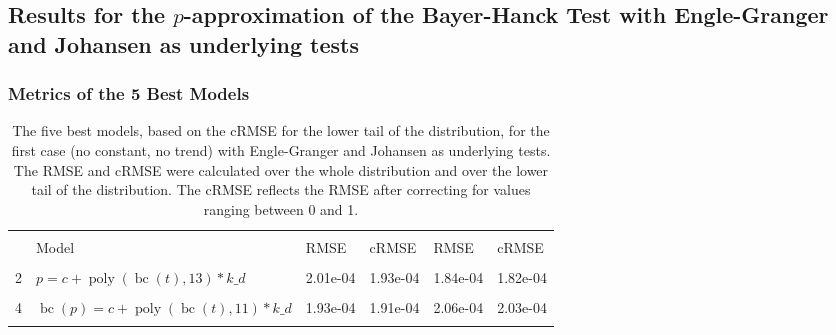 \documentclass[12pt,a4paper]{article}
\DeclareMathOperator{\bc}{bc}
\DeclareMathOperator{\poly}{poly}
\begin{document}
\hypertarget{results-for-the-p-approximation-of-the-bayer-hanck-test-with-engle-granger-and-johansen-as-underlying-tests}{%
\subsection{\texorpdfstring{Results for the \(p\)-approximation of the
Bayer-Hanck Test with Engle-Granger and Johansen as underlying
tests}{Results for the p-approximation of the Bayer-Hanck Test with Engle-Granger and Johansen as underlying tests}}\label{results-for-the-p-approximation-of-the-bayer-hanck-test-with-engle-granger-and-johansen-as-underlying-tests}}

\hypertarget{metrics-of-the-5-best-models-1}{%
\subsubsection{Metrics of the 5 Best
Models}\label{metrics-of-the-5-best-models-1}}

\begin{table}[!h]

\caption{\label{tab:5_best_e_j_1}\label{tab:best_e_j_1} The five best models, based on the cRMSE for the lower tail of the distribution, for the first case (no constant, no trend) with Engle-Granger and Johansen as underlying tests. The RMSE and cRMSE were calculated over the whole distribution and over the lower tail of the distribution. The cRMSE reflects the RMSE after correcting for values ranging between 0 and 1.}
\centering
\fontsize{10}{12}\selectfont
\begin{tabular}[t]{ll>{\raggedleft\arraybackslash}p{2cm}>{\raggedleft\arraybackslash}p{2cm}>{\raggedleft\arraybackslash}p{2cm}>{\raggedleft\arraybackslash}p{2cm}}
\toprule
\multicolumn{1}{c}{\textbf{}} & \multicolumn{1}{c}{\textbf{}} & \multicolumn{2}{c}{\textbf{Full Distribution}} & \multicolumn{2}{c}{\textbf{Lower Tail ($p \leq 0.2$)}} \\
\cmidrule(l{3pt}r{3pt}){3-4} \cmidrule(l{3pt}r{3pt}){5-6}
  & Model & RMSE & cRMSE & RMSE & cRMSE\\
\midrule
\cellcolor{gray!6}{1} & \cellcolor{gray!6}{$\bc(p) = c + \poly\left( \bc(t), 13 \right) * k\_d$} & \cellcolor{gray!6}{1.40e-04} & \cellcolor{gray!6}{1.40e-04} & \cellcolor{gray!6}{1.48e-04} & \cellcolor{gray!6}{1.48e-04}\\
2 & $p = c + \poly\left( \bc(t), 13 \right) * k\_d$ & 2.01e-04 & 1.93e-04 & 1.84e-04 & 1.82e-04\\
\cellcolor{gray!6}{3} & \cellcolor{gray!6}{$\bc(p) = c + \poly\left( \bc(t), 12 \right) * k\_d$} & \cellcolor{gray!6}{1.92e-04} & \cellcolor{gray!6}{1.86e-04} & \cellcolor{gray!6}{2.09e-04} & \cellcolor{gray!6}{2.01e-04}\\
4 & $\bc(p) = c + \poly\left( \bc(t), 11 \right) * k\_d$ & 1.93e-04 & 1.91e-04 & 2.06e-04 & 2.03e-04\\
\cellcolor{gray!6}{5} & \cellcolor{gray!6}{$\log(p) = c + \poly\left( \bc(t), 9 \right) * k\_d$} & \cellcolor{gray!6}{2.12e-04} & \cellcolor{gray!6}{2.03e-04} & \cellcolor{gray!6}{2.30e-04} & \cellcolor{gray!6}{2.20e-04}\\
\bottomrule
\end{tabular}
\end{table}
\end{document}
